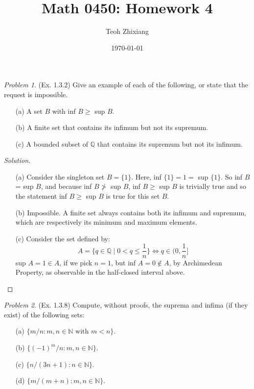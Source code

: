 \documentclass[11pt,twoside, reqno, align]{amsart}
\theoremstyle{remark}
\newtheorem{Prob}{Problem}
\def\Q{\mathbb Q}
\def\N{\mathbb N}
\renewcommand{\iff}{\Leftrightarrow}
\begin{document}
\title{Math 0450: Homework 4}
\date{\today}
\author{Teoh Zhixiang}

\maketitle


\begin{Prob}(Ex. 1.3.2)
Give an example of each of the following, or state that the request is impossible.
\begin{enumerate}
    \item[(a)] A set $B$ with inf $B \geq$ sup $B$. 
    \item[(b)] A finite set that contains its infimum but not its supremum.
    \item[(c)] A bounded subset of $\Q$ that contains its supremum but not its infimum.
\end{enumerate}
\end{Prob}

\begin{proof}[Solution]\;
\begin{enumerate}
    \item[(a)] Consider the singleton set $B = \{1\}$. Here, inf $\{1\} = 1 =$ sup $\{1\}$. So inf $B$ = sup $B$, and because inf $B \not>$ sup $B$, inf $B \geq$ sup $B$ is trivially true and so the statement inf $B \geq$ sup $B$ is true for this set $B$.
    \item[(b)] Impossible. A finite set always contains both its infimum and supremum, which are respectively its minimum and maximum elements.
    \item[(c)] Consider the set defined by:
    $$
    A = \{q \in \Q \mid 0 < q \leq \frac{1}{n}\} \iff q \in (0,\frac{1}{n}] 
    $$
    sup $A = 1 \in A$, if we pick $n = 1$, but inf $A = 0 \not\in A$, by Archimedean Property, as observable in the half-closed interval above. 
\end{enumerate}
\end{proof}

\begin{Prob}(Ex. 1.3.8)
Compute, without proofs, the suprema and infima (if they exist) of the following sets:
\begin{enumerate}
    \item[(a)] $\{m/n : m,n \in \N \text{ with } m < n\}$.
    \item[(b)] $\{(-1)^m/n : m,n \in \N\}$.
    \item[(c)] $\{n/(3n+1) : n \in \N\}$.
    \item[(d)] $\{m/(m+n) : m,n \in \N\}$.
\end{enumerate}
\end{Prob}
\end{document}
